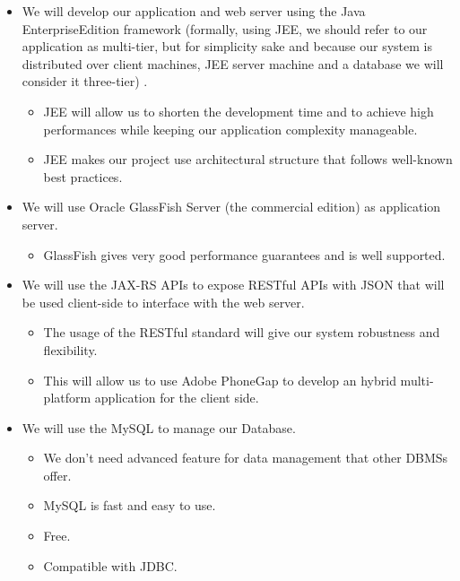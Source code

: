\documentclass[]{article}
\providecommand{\tightlist}{%
  \setlength{\itemsep}{0pt}\setlength{\parskip}{0pt}}
\begin{document}
\begin{itemize}
\item
  We will develop our application and web server using the Java
  EnterpriseEdition framework (formally, using JEE, we should refer to
  our application as multi-tier, but for simplicity sake and because our
  system is distributed over client machines, JEE server machine and a
  database we will consider it three-tier) .

  \begin{itemize}
  \tightlist
  \item
    JEE will allow us to shorten the development time and to achieve
    high performances while keeping our application complexity
    manageable.
  \item
    JEE makes our project use architectural structure that follows
    well-known best practices.
  \end{itemize}
\item
  We will use Oracle GlassFish Server (the commercial edition) as
  application server.

  \begin{itemize}
  \tightlist
  \item
    GlassFish gives very good performance guarantees and is well
    supported.
  \end{itemize}
\item
  We will use the JAX-RS APIs to expose RESTful APIs with JSON that will
  be used client-side to interface with the web server.

  \begin{itemize}
  \tightlist
  \item
    The usage of the RESTful standard will give our system robustness
    and flexibility.
  \item
    This will allow us to use Adobe PhoneGap to develop an hybrid
    multi-platform application for the client side.
  \end{itemize}
\item
  We will use the MySQL to manage our Database.

  \begin{itemize}
  \tightlist
  \item
    We don't need advanced feature for data management that other DBMSs
    offer.
  \item
    MySQL is fast and easy to use.
  \item
    Free.
  \item
    Compatible with JDBC.\newline
  \end{itemize}
\end{itemize}
\end{document}
